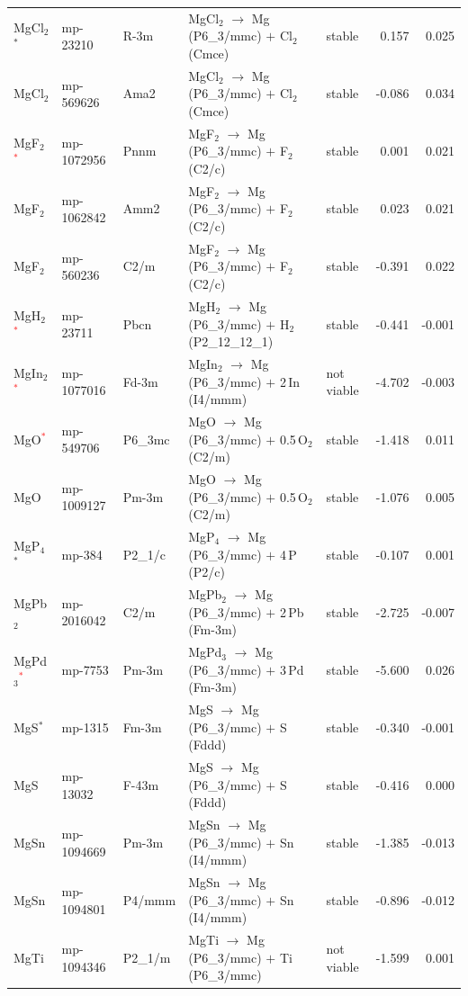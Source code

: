 \begin{longtable}{@{}ll l@{\hspace{4pt}} p{4.6cm} l@{\hspace{4pt}} rr@{}}
MgCl$_{2}$$^*$ & mp-23210 & R-3m & MgCl$_{2}$ $\to$ Mg (P6\_3/mmc) $+$ Cl$_{2}$ (Cmce) & stable & 0.157 & 0.025 \\
MgCl$_{2}$ & mp-569626 & Ama2 & MgCl$_{2}$ $\to$ Mg (P6\_3/mmc) $+$ Cl$_{2}$ (Cmce) & stable & -0.086 & 0.034 \\
MgF$_{2}$\textcolor{red}{$^*$} & mp-1072956 & Pnnm & MgF$_{2}$ $\to$ Mg (P6\_3/mmc) $+$ F$_{2}$ (C2/c) & stable & 0.001 & 0.021 \\
MgF$_{2}$ & mp-1062842 & Amm2 & MgF$_{2}$ $\to$ Mg (P6\_3/mmc) $+$ F$_{2}$ (C2/c) & stable & 0.023 & 0.021 \\
MgF$_{2}$ & mp-560236 & C2/m & MgF$_{2}$ $\to$ Mg (P6\_3/mmc) $+$ F$_{2}$ (C2/c) & stable & -0.391 & 0.022 \\
MgH$_{2}$\textcolor{red}{$^*$} & mp-23711 & Pbcn & MgH$_{2}$ $\to$ Mg (P6\_3/mmc) $+$ H$_{2}$ (P2\_12\_12\_1) & stable & -0.441 & -0.001 \\
MgIn$_{2}$\textcolor{red}{$^*$} & mp-1077016 & Fd-3m & MgIn$_{2}$ $\to$ Mg (P6\_3/mmc) $+$ 2\,In (I4/mmm) & not viable & -4.702 & -0.003 \\
MgO\textcolor{red}{$^*$} & mp-549706 & P6\_3mc & MgO $\to$ Mg (P6\_3/mmc) $+$ 0.5\,O$_{2}$ (C2/m) & stable & -1.418 & 0.011 \\
MgO & mp-1009127 & Pm-3m & MgO $\to$ Mg (P6\_3/mmc) $+$ 0.5\,O$_{2}$ (C2/m) & stable & -1.076 & 0.005 \\
MgP$_{4}$$^*$ & mp-384 & P2\_1/c & MgP$_{4}$ $\to$ Mg (P6\_3/mmc) $+$ 4\,P (P2/c) & stable & -0.107 & 0.001 \\
MgPb$_{2}$ & mp-2016042 & C2/m & MgPb$_{2}$ $\to$ Mg (P6\_3/mmc) $+$ 2\,Pb (Fm-3m) & stable & -2.725 & -0.007 \\
MgPd$_{3}$\textcolor{red}{$^*$} & mp-7753 & Pm-3m & MgPd$_{3}$ $\to$ Mg (P6\_3/mmc) $+$ 3\,Pd (Fm-3m) & stable & -5.600 & 0.026 \\
MgS$^*$ & mp-1315 & Fm-3m & MgS $\to$ Mg (P6\_3/mmc) $+$ S (Fddd) & stable & -0.340 & -0.001 \\
MgS & mp-13032 & F-43m & MgS $\to$ Mg (P6\_3/mmc) $+$ S (Fddd) & stable & -0.416 & 0.000 \\
MgSn & mp-1094669 & Pm-3m & MgSn $\to$ Mg (P6\_3/mmc) $+$ Sn (I4/mmm) & stable & -1.385 & -0.013 \\
MgSn & mp-1094801 & P4/mmm & MgSn $\to$ Mg (P6\_3/mmc) $+$ Sn (I4/mmm) & stable & -0.896 & -0.012 \\
MgTi & mp-1094346 & P2\_1/m & MgTi $\to$ Mg (P6\_3/mmc) $+$ Ti (P6\_3/mmc) & not viable & -1.599 & 0.001 \\

\end{longtable}

